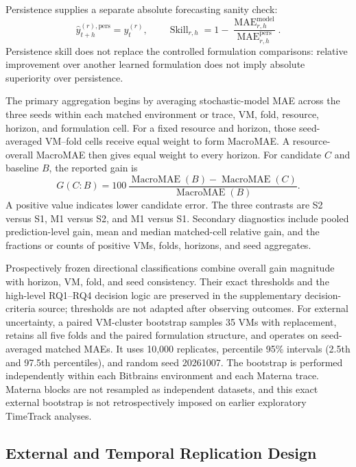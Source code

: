 \documentclass[a4paper,fleqn]{cas-dc}
\begin{document}
Persistence supplies a separate absolute forecasting sanity check:
\begin{equation}
  \widehat{y}_{t+h}^{(r),\mathrm{pers}}=y_t^{(r)},
  \qquad
  \operatorname{Skill}_{r,h}
  =1-\frac{\operatorname{MAE}_{r,h}^{\mathrm{model}}}
           {\operatorname{MAE}_{r,h}^{\mathrm{pers}}}.
  \label{eq:persistence-skill}
\end{equation}
Persistence skill does not replace the controlled formulation comparisons:
relative improvement over another learned formulation does not imply absolute
superiority over persistence.

The primary aggregation begins by averaging stochastic-model MAE across the
three seeds within each matched environment or trace, VM, fold, resource,
horizon, and formulation cell.  For a fixed resource and horizon, those
seed-averaged VM--fold cells receive equal weight to form MacroMAE.  A
resource-overall MacroMAE then gives equal weight to every horizon.  For
candidate $C$ and baseline $B$, the reported gain is
\begin{equation}
  G(C\!:\!B)=100\,
  \frac{\operatorname{MacroMAE}(B)-\operatorname{MacroMAE}(C)}
       {\operatorname{MacroMAE}(B)}.
  \label{eq:macro-gain}
\end{equation}
A positive value indicates lower candidate error.  The three contrasts are S2
versus S1, M1 versus S2, and M1 versus S1.  Secondary diagnostics include
pooled prediction-level gain, mean and median matched-cell relative gain, and
the fractions or counts of positive VMs, folds, horizons, and seed aggregates.

Prospectively frozen directional classifications combine overall gain magnitude
with horizon, VM, fold, and seed consistency.  Their exact thresholds and the
high-level RQ1--RQ4 decision logic are preserved in the supplementary
decision-criteria source; thresholds are not adapted after observing outcomes.
For external uncertainty, a paired VM-cluster bootstrap samples 35 VMs with
replacement, retains all five folds and the paired formulation structure, and
operates on seed-averaged matched MAEs.  It uses 10,000 replicates, percentile
95\% intervals (2.5th and 97.5th percentiles), and random seed 20261007.  The
bootstrap is performed independently within each Bitbrains environment and
each Materna trace.  Materna blocks are not resampled as independent datasets,
and this exact external bootstrap is not retrospectively imposed on earlier
exploratory TimeTrack analyses.

\subsection{External and Temporal Replication Design}
\label{sec:replication-design}
\end{document}
